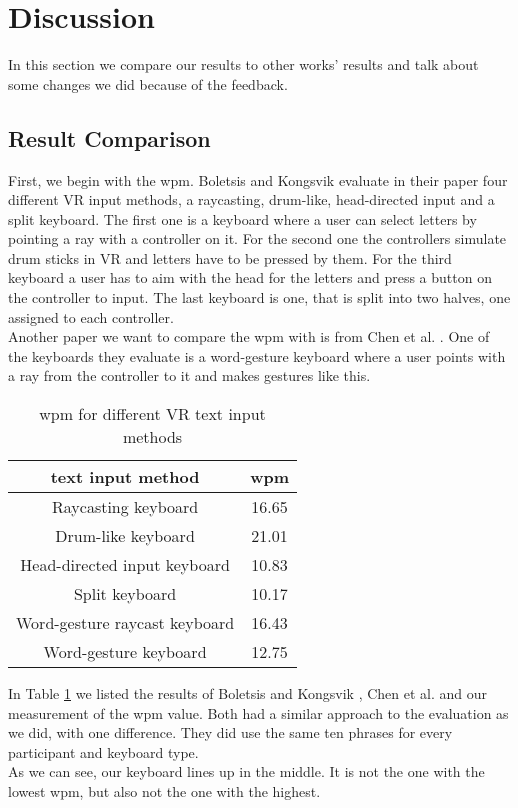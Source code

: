 \section{Discussion}
In this section we compare our results to other works' results and talk about some changes we did because of the feedback.

\subsection{Result Comparison}
First, we begin with the wpm. Boletsis and Kongsvik \cite{Boletsis2019ControllerbasedTT} evaluate in their paper four different VR input methods, a raycasting, drum-like, head-directed input and a split keyboard. The first one is a keyboard where a user can select letters by pointing a ray with a controller on it. For the second one the controllers simulate drum sticks in VR and letters have to be pressed by them. For the third keyboard a user has to aim with the head for the letters and press a button on the controller to input. The last keyboard is one, that is split into two halves, one assigned to each controller.\\
Another paper we want to compare the wpm with is from Chen et al. \cite{10.1145/3290607.3312762}. One of the keyboards they evaluate is a word-gesture keyboard where a user points with a ray from the controller to it and makes gestures like this.
\begin{table}[ht!]
    \centering
    \caption{wpm for different VR text input methods}
    \begin{tabular}{cc} \toprule
        text input method&wpm\\ \midrule
        Raycasting keyboard& 16.65\\
        Drum-like keyboard& 21.01\\
        Head-directed input keyboard& 10.83\\
        Split keyboard& 10.17\\
        Word-gesture raycast keyboard& 16.43\\
        Word-gesture keyboard& 12.75\\
        \bottomrule
    \end{tabular}
    \label{tab:wpm_compare}
\end{table}

In Table \ref{tab:wpm_compare} we listed the results of Boletsis and Kongsvik \cite{Boletsis2019ControllerbasedTT},  Chen et al. \cite{10.1145/3290607.3312762} and our measurement of the wpm value. Both had a similar approach to the evaluation as we did, with one difference. They did use the same ten phrases for every participant and keyboard type.\\
As we can see, our keyboard lines up in the middle. It is not the one with the lowest wpm, but also not the one with the highest.

